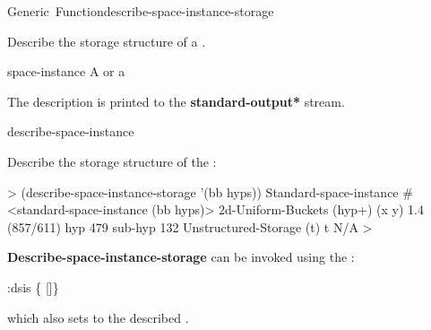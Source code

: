 \documentclass[10pt,twoside,english,pdftex]{article}
\begin{document}

\begin{functiondoc}{Generic~Function}{describe-space-instance-storage}%
  {}
%
%

\fnsyntax

\fnpurpose Describe the storage structure of a .

\fnmethods
{}%
  {\code{(} }
%
  {\code{(} }

\fnpackage {}

\fnmodule {}

\fnargs
\begin{args}{space-instance}
 A  or a 
\end{args}

\fndescription
{}%
The description is printed to the {\bf *standard-output*} stream.

\begin{alsos}{describe-space-instance}
\end{alsos}

\fnexample
Describe the storage structure of the  :
%
\W\supp
\begin{example}
  > (describe-space-instance-storage '(bb hyps))
    Standard-space-instance #<standard-space-instance (bb hyps)>
    2d-Uniform-Buckets (hyp+) (x y) 1.4 (857/611)
       hyp             479
       sub-hyp         132
    Unstructured-Storage (t) t N/A
  >
\end{example}

\replnote 
%
%
%
\textbf{Describe-space-instance-storage} can be invoked using the
:

%
\W\supp
\begin{example}
  :dsis  \vbar \{ \textrm{[}\textrm{]}\}
\end{example}
%
which also sets \code{=} to the described .

\end{functiondoc}
\end{document}
